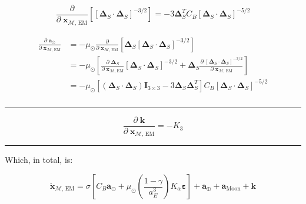 \documentclass[]{article}
\newcommand{\pd}[2]{\frac{\partial\;#1}{\partial\;#2}}
\newcommand{\pddown}[2]{\frac{\partial}{\partial\;#2} \left[ #1 \right] }
\begin{document}
	\begin{equation*}
		\pddown{ [\boldsymbol{\Delta}_S \cdot \boldsymbol{\Delta}_S]^{-3/2} }{\mathbf{x}_{\mathcal{M}\text{, EM}}} = -3 \boldsymbol{\Delta}_S^T C_B [\boldsymbol{\Delta}_S \cdot \boldsymbol{\Delta}_S]^{-5/2}
	\end{equation*}
	
	\begin{align}
	\begin{split}
		\pd{\mathbf{a}_{\odot}}{ \mathbf{x}_{\mathcal{M}\text{, EM}} } 
		&= -\mu_\odot \pddown{ \boldsymbol{\Delta}_S [\boldsymbol{\Delta}_S\cdot\boldsymbol{\Delta}_S]^{-3/2} }{ \mathbf{x}_{\mathcal{M}\text{, EM}} } \\
		&= -\mu_\odot \left[ \pd{ \boldsymbol{\Delta}_S}{ \mathbf{x}_{\mathcal{M}\text{, EM}} }[\boldsymbol{\Delta}_S\cdot\boldsymbol{\Delta}_S]^{-3/2} + \boldsymbol{\Delta}_S \pd{ [\boldsymbol{\Delta}_S\cdot\boldsymbol{\Delta}_S]^{-3/2} }{ \mathbf{x}_{\mathcal{M}\text{, EM}} } \right] \\
		&= -\mu_\odot \left[ (\boldsymbol{\Delta}_S\cdot\boldsymbol{\Delta}_S) \mathbf{I}_{3\times 3} - 3 \boldsymbol{\Delta}_S \boldsymbol{\Delta}_S^T \right] C_B [\boldsymbol{\Delta}_S \cdot \boldsymbol{\Delta}_S]^{-5/2} \\
	\end{split}
	\end{align}
	
	\hrule \vspace{1em}
	
	\begin{equation*}
		\pd{\mathbf{k}}{ \mathbf{x}_{\mathcal{M}\text{, EM}} } = -K_3
	\end{equation*}
	
	\hrule \vspace{1em}
	
	Which, in total, is:
	
	\begin{equation}
		\ddot{\mathbf{x}}_{\mathcal{M}\text{, EM}} = \sigma \left[ C_B  \mathbf{a}_{\odot} + \mu_\odot \left(\frac{1-\gamma}{a_E^3}\right) K_\alpha \boldsymbol{\varepsilon} \right] + \mathbf{a}_\oplus +  \mathbf{a}_\text{Moon}  + \mathbf{k}
	\end{equation}
	
\end{document}
